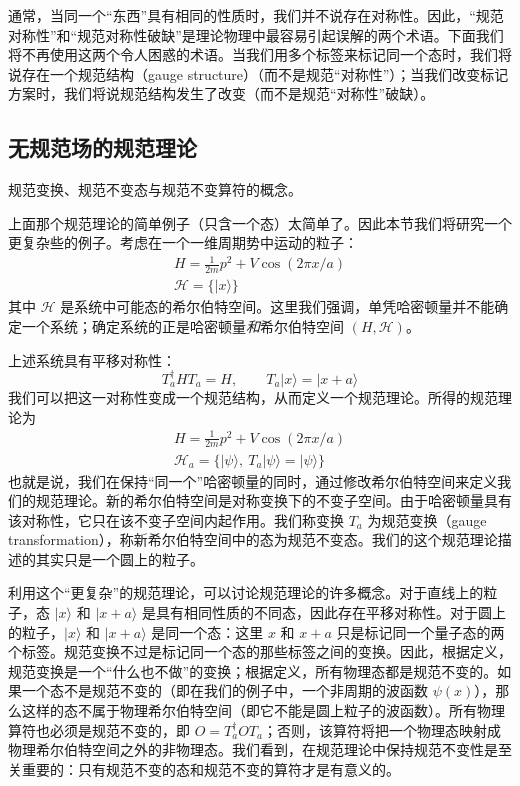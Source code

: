 通常，当同一个“东西”具有相同的性质时，我们并不说存在对称性。因此，“规范对称性”和“规范对称性破缺”是理论物理中最容易引起误解的两个术语。下面我们将不再使用这两个令人困惑的术语。当我们用多个标签来标记同一个态时，我们将说存在一个规范结构（gauge structure）（而不是规范“对称性”）；当我们改变标记方案时，我们将说规范结构发生了改变（而不是规范“对称性”破缺）。

\subsection{无规范场的规范理论}

\begin{keypoints}
\item 规范变换、规范不变态与规范不变算符的概念。
\end{keypoints}

上面那个规范理论的简单例子（只含一个态）太简单了。因此本节我们将研究一个更复杂些的例子。考虑在一个一维周期势中运动的粒子：
\begin{gather*}
H = \frac{1}{2m}p^2 + V\cos(2\pi x/a)\\
\mathcal{H} = \{|x\rangle\}\tag{6.1.1}
\end{gather*}
其中 $\mathcal{H}$ 是系统中可能态的希尔伯特空间。这里我们强调，单凭哈密顿量并不能确定一个系统；确定系统的正是哈密顿量\emph{和}希尔伯特空间 $(H,\mathcal{H})$。

上述系统具有平移对称性：
\begin{equation*}
T_a^\dagger H T_a = H, \qquad T_a|x\rangle = |x+a\rangle
\end{equation*}
我们可以把这一对称性变成一个规范结构，从而定义一个规范理论。所得的规范理论为
\begin{gather*}
H = \frac{1}{2m}p^2 + V\cos(2\pi x/a)\\
\mathcal{H}_a = \{|\psi\rangle,\ T_a|\psi\rangle = |\psi\rangle\}\tag{6.1.2}
\end{gather*}
也就是说，我们在保持“同一个”哈密顿量的同时，通过修改希尔伯特空间来定义我们的规范理论。新的希尔伯特空间是对称变换下的不变子空间。由于哈密顿量具有该对称性，它只在该不变子空间内起作用。我们称变换 $T_a$ 为规范变换（gauge transformation），称新希尔伯特空间中的态为规范不变态。我们的这个规范理论描述的其实只是一个圆上的粒子。

利用这个“更复杂”的规范理论，可以讨论规范理论的许多概念。对于直线上的粒子，态 $|x\rangle$ 和 $|x+a\rangle$ 是具有相同性质的不同态，因此存在平移对称性。对于圆上的粒子，$|x\rangle$ 和 $|x+a\rangle$ 是同一个态：这里 $x$ 和 $x+a$ 只是标记同一个量子态的两个标签。规范变换不过是标记同一个态的那些标签之间的变换。因此，根据定义，规范变换是一个“什么也不做”的变换；根据定义，所有物理态都是规范不变的。如果一个态不是规范不变的（即在我们的例子中，一个非周期的波函数 $\psi(x)$），那么这样的态不属于物理希尔伯特空间（即它不能是圆上粒子的波函数）。所有物理算符也必须是规范不变的，即 $O = T_a^\dagger O T_a$；否则，该算符将把一个物理态映射成物理希尔伯特空间之外的非物理态。我们看到，在规范理论中保持规范不变性是至关重要的：只有规范不变的态和规范不变的算符才是有意义的。

